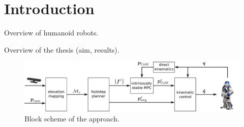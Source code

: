 \chapter{Introduction}
Overview of humanoid robots.

Overview of the thesis (aim, results).

\begin{figure}
  \centering
  \includegraphics[width=\textwidth]{figures/BlockScheme.pdf}
  \caption{Block scheme of the approach.}
  \label{fig:block-scheme}
\end{figure}
